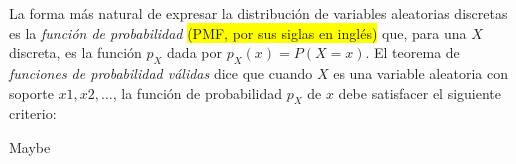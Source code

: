 \documentclass[12pt,letterpaper]{article}
\begin{document}
La forma más natural de expresar la distribución de variables aleatorias discretas es la \emph{función de probabilidad}\cite{blitz19} \colorbox{yellow}{(PMF, por sus siglas en inglés)} que, para una $X$ discreta, es la función $p_X$ dada por $p_X(x)=P(X=x)$. El teorema de \emph{funciones de probabilidad válidas} dice que cuando $X$ es una variable aleatoria con soporte $x1,x2,\ldots$, la función de probabilidad $p_X$ de $x$ debe satisfacer el siguiente criterio:
























\newpage
Maybe\cite{blitz19}
\newpage
\printbibliography[heading=bibintoc,title={Fuentes}]
\end{document}
